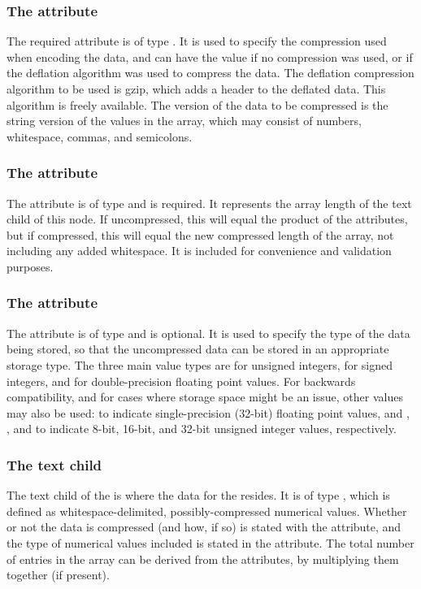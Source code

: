 \subsubsection{The \fixttspace{} attribute}
The required  attribute is of type . It is used to specify the compression used when encoding the data, and can have the value  if no compression was used, or  if the deflation algorithm was used to compress the data.  The deflation compression algorithm to be used is gzip, which adds a header to the deflated data.  This algorithm is freely available.  The version of the data to be compressed is the string version of the values in the array, which may consist of numbers, whitespace, commas, and semicolons.

\subsubsection{The \fixttspace{} attribute}
The  attribute is of type  and is required. It represents the array length of the  text child of this node.  If uncompressed, this will equal the product of the  attributes, but if compressed, this will equal the new compressed length of the array, not including any added whitespace.  It is included for convenience and validation purposes.

\subsubsection{The \fixttspace{} attribute}
The  attribute is of type  and is optional.  It is used to specify the type of the data being stored, so that the uncompressed data can be stored in an appropriate storage type.  The three main value types are  for unsigned integers,  for signed integers, and  for double-precision floating point values.  For backwards compatibility, and for cases where storage space might be an issue, other values may also be used:  to indicate single-precision (32-bit) floating point values, and , , and  to indicate 8-bit, 16-bit, and 32-bit unsigned integer values, respectively.

\subsubsection{The \fixttspace{} text child}
The  text child of the \SampledField is where the data for the \SampledField resides.  It is of type , which is defined as whitespace-delimited, possibly-compressed numerical values.  Whether or not the data is compressed (and how, if so) is stated with the  attribute, and the type of numerical values included is stated in the  attribute.  The total number of entries in the array can be derived from the  attributes, by multiplying them together (if present).  

